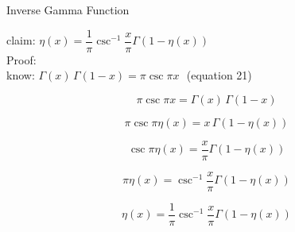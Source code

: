 \documentclass[12pt]{article}
\begin{document}
\pagebreak
\begin{section}{Inverse Gamma Function}
	
	claim: $\eta(x)=\dfrac1\pi\csc^{-1}\dfrac x\pi\Gamma(1-\eta(x))$\\
	Proof:\\
	know: $\Gamma(x)\,\Gamma(1-x)=\pi\csc\pi x~~~$(equation 21)

	\begin{equation}\pi\csc\pi x=\Gamma(x)\,\Gamma(1-x)\end{equation}

	\begin{equation}\pi\csc\pi\eta(x)=x\,\Gamma(1-\eta(x))\end{equation}

	\begin{equation}\csc\pi\eta(x)=\dfrac x\pi\Gamma(1-\eta(x))\end{equation}

	\begin{equation}\pi\eta(x)=\csc^{-1}\dfrac x\pi\Gamma(1-\eta(x))\end{equation}

	\begin{equation}\eta(x)=\dfrac1\pi\csc^{-1}\dfrac x\pi\Gamma(1-\eta(x))\end{equation}

	\noindent\blacksquare


\end{section}
\end{document}
